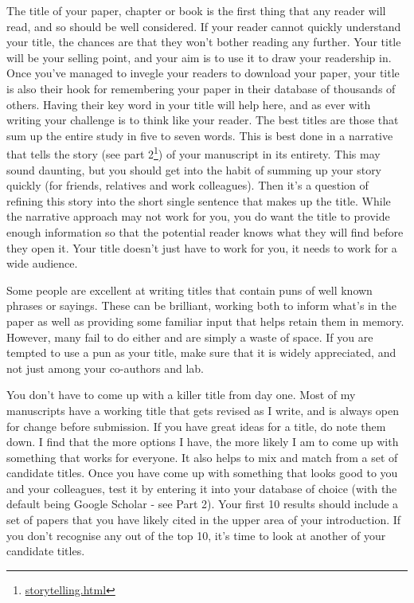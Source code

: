 \documentclass[
]{krantz}
\renewcommand{\href}[2]{#2\footnote{\url{#1}}}
\begin{document}
The title of your paper, chapter or book is the first thing that any reader will read, and so should be well considered. If your reader cannot quickly understand your title, the chances are that they won't bother reading any further. Your title will be your selling point, and your aim is to use it to draw your readership in. Once you've managed to invegle your readers to download your paper, your title is also their hook for remembering your paper in their database of thousands of others. Having their key word in your title will help here, and as ever with writing your challenge is to think like your reader. The best titles are those that sum up the entire study in five to seven words. This is best done in a narrative that tells the story (\href{storytelling.html}{see part 2}) of your manuscript in its entirety. This may sound daunting, but you should get into the habit of summing up your story quickly (for friends, relatives and work colleagues). Then it's a question of refining this story into the short single sentence that makes up the title. While the narrative approach may not work for you, you do want the title to provide enough information so that the potential reader knows what they will find before they open it. Your title doesn't just have to work for you, it needs to work for a wide audience.

Some people are excellent at writing titles that contain puns of well known phrases or sayings. These can be brilliant, working both to inform what's in the paper as well as providing some familiar input that helps retain them in memory. However, many fail to do either and are simply a waste of space. If you are tempted to use a pun as your title, make sure that it is widely appreciated, and not just among your co-authors and lab.

You don't have to come up with a killer title from day one. Most of my manuscripts have a working title that gets revised as I write, and is always open for change before submission. If you have great ideas for a title, do note them down. I find that the more options I have, the more likely I am to come up with something that works for everyone. It also helps to mix and match from a set of candidate titles. Once you have come up with something that looks good to you and your colleagues, test it by entering it into your database of choice (with the default being Google Scholar - see Part 2). Your first 10 results should include a set of papers that you have likely cited in the upper area of your introduction. If you don't recognise any out of the top 10, it's time to look at another of your candidate titles.
\end{document}
